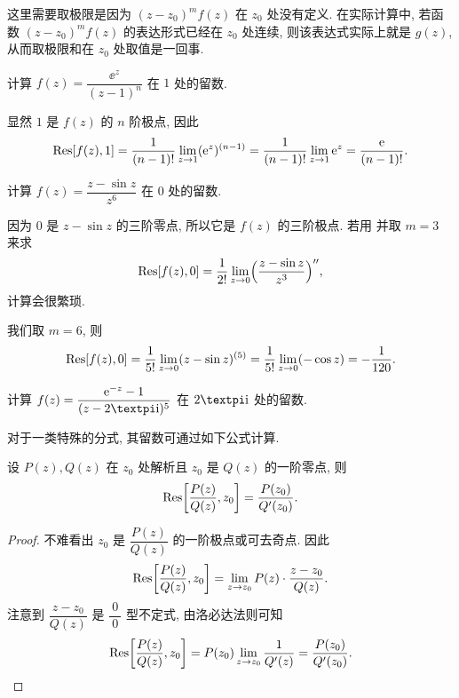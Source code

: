 这里需要取极限是因为 $(z-z_0)^mf(z)$ 在 $z_0$ 处没有定义.
在实际计算中, 若函数 $(z-z_0)^mf(z)$ 的表达形式已经在 $z_0$ 处连续, 则该表达式实际上就是 $g(z)$, 从而取极限和在 $z_0$ 处取值是一回事.

\begin{example}
  计算 $f(z)=\dfrac{\ee^z}{(z-1)^n}$ 在 $1$ 处的留数.
\end{example}

\begin{solution}
  显然 $1$ 是 $f(z)$ 的 $n$ 阶极点, 因此
  \[
     {\mathrm{Res}}[f(z),1]
    =\frac1{(n-1)!}\lim_{z\rightarrow 1}(\mathrm{e}^z)^{(n-1)}
    =\frac1{(n-1)!}\lim_{z\rightarrow 1}\mathrm{e}^z
    =\frac{\mathrm{e}}{(n-1)!}.
  \]
\end{solution}

\begin{example}
  计算 $f(z)=\dfrac{z-\sin z}{z^6}$ 在 $0$ 处的留数.
\end{example}

\begin{solution}
  因为 $0$ 是 $z-\sin z$ 的三阶零点, 所以它是 $f(z)$ 的三阶极点.
  若用 并取 $m=3$ 来求
  \[
     {\mathrm{Res}}[f(z),0]
    =\frac1{2!}\lim_{z\rightarrow0}\Bigl(\frac{z-\sin z}{z^3}\Bigr)'',
  \]
  计算会很繁琐.
  
  我们取 $m=6$, 则
  \[
     {\mathrm{Res}}[f(z),0]
    =\frac1{5!}\lim_{z\rightarrow 0}(z-\sin z)^{(5)}
    =\frac1{5!}\lim_{z\rightarrow 0}(-\cos z)
    =-\frac1{120}.
  \]
\end{solution}

\begin{exercise}
  计算 $f(z)=\dfrac{\ee^{-z}-1}{(z-2\cpi\ii)^5}$ 在 $2\cpi\ii$ 处的留数.
\end{exercise}

对于一类特殊的分式, 其留数可通过如下公式计算.

\begin{theorem}
  \label{thm:residue-iii}
  设 $P(z),Q(z)$ 在 $z_0$ 处解析且 $z_0$ 是 $Q(z)$ 的一阶零点, 则
  \[
     {\mathrm{Res}}\biggl[\frac{P(z)}{Q(z)},z_0\biggr]
    =\frac{P(z_0)}{Q'(z_0)}.
  \]
\end{theorem}

\begin{proof}
  不难看出 $z_0$ 是 $\dfrac{P(z)}{Q(z)}$ 的一阶极点或可去奇点. 因此
  \[
    {\mathrm{Res}}\biggl[\frac{P(z)}{Q(z)},z_0\biggr]
    =\lim_{z\rightarrow z_0}P(z)\cdot \frac{z-z_0}{Q(z)}.
  \]
  注意到 $\dfrac{z-z_0}{Q(z)}$ 是 $\dfrac{~0~}0$ 型不定式, 由洛必达法则可知
  \[
     {\mathrm{Res}}\biggl[\frac{P(z)}{Q(z)},z_0\biggr]
    =P(z_0)\lim_{z\rightarrow z_0}\frac1{Q'(z)}
    =\frac{P(z_0)}{Q'(z_0)}.\qedhere
  \]
\end{proof}

